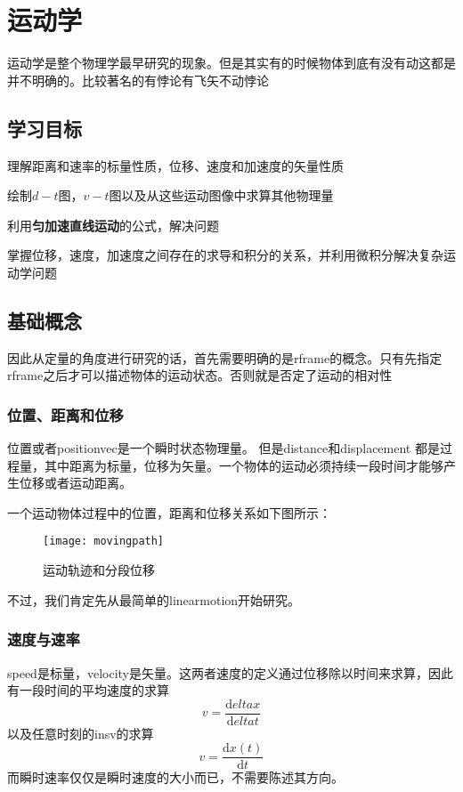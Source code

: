 \chapter{运动学}
\label{ch:Kinematics in Straight Line}
运动学是整个物理学最早研究的现象。但是其实有的时候物体到底有没有动这都是并不明确的。比较著名的有悖论有飞矢不动悖论

\section*{学习目标}
\begin{todolist}
	\item 理解距离和速率的标量性质，位移、速度和加速度的矢量性质
	\item 绘制$d-t$图，$v-t$图以及从这些运动图像中求算其他物理量
	\item 利用\textbf{匀加速直线运动}的公式，解决问题
	\item 掌握位移，速度，加速度之间存在的求导和积分的关系，并利用微积分解决复杂运动学问题
\end{todolist}

\clearpage


\section{基础概念}
\label{sec:Basic Concepts}
因此从定量的角度进行研究的话，首先需要明确的是\gls{rframe}的概念。只有先指定\gls{rframe}之后才可以描述物体的运动状态。否则就是否定了运动的相对性


\subsection*{位置、距离和位移}
\label{subsec:Positiosn,Distantce,Displacement}
位置或者\gls{positionvec}是一个瞬时状态物理量。
但是\gls{distance}和\gls{displacement} 都是过程量，其中距离为标量，位移为矢量。一个物体的运动必须持续\textcolor{r1}{一段时间}才能够产生位移或者运动距离。

一个运动物体过程中的位置，距离和位移关系如下图所示：
\begin{figure}[H]
	\centering
	\texttt{[image: movingpath]}
	\caption{运动轨迹和分段位移}
\end{figure}
不过，我们肯定先从最简单的\gls{linearmotion}开始研究。


\subsection*{速度与速率}
\label{subsec:Velocity vs Speed}
\gls{speed}是标量，\gls{velocity}是矢量。这两者速度的定义通过\textcolor{r1}{位移除以时间}来求算，因此有\textcolor{r1}{一段时间的平均速度}的求算
\[
	v=\frac{\mathrm{d}elta x}{\mathrm{d}elta t}
\]
以及\textcolor{r1}{任意时刻的}\gls{insv}的求算
\[
	v=\frac{\mathrm{d} x(t)}{\mathrm{d} t}
\]
而瞬时速率仅仅是瞬时速度的大小而已，不需要陈述其方向。

